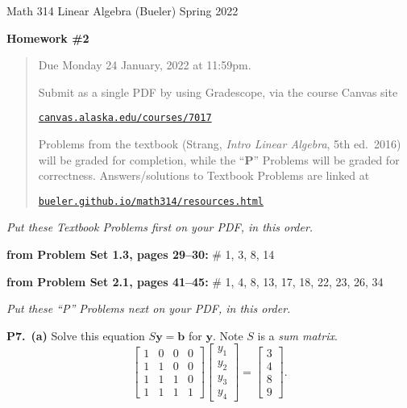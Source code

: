 \documentclass[12pt]{amsart}
\newcommand{\bb}{\bm{b}}
\newcommand{\by}{\bm{y}}
\newcommand{\prob}[1]{\bigskip\noindent\textbf{#1}\quad }
\newcommand{\probset}[2]{\prob{from Problem Set #1, pages #2:}}
\newcommand{\ppart}[1]{\,\textbf{(#1)}\quad }
\begin{document}
\scriptsize \noindent Math 314 Linear Algebra (Bueler) \hfill Spring 2022
\normalsize\medskip

\Large
\centerline{\textbf{Homework \#2}}

\normalsize
\bigskip
\begin{quote}
Due Monday 24 January, 2022 at 11:59pm.

\medskip
\noindent Submit as a single PDF by using Gradescope, via the course Canvas site

\href{https://canvas.alaska.edu/courses/7017}{\texttt{canvas.alaska.edu/courses/7017}}

\noindent Problems from the textbook (Strang, \emph{Intro Linear Algebra}, 5th ed.~2016) will be graded for completion, while the ``\textbf{P}'' Problems will be graded for correctness.  Answers/solutions to Textbook Problems are linked at

\href{https://bueler.github.io/math314/resources.html}{\texttt{bueler.github.io/math314/resources.html}}
\end{quote}
\medskip

\thispagestyle{empty}

\noindent \hrulefill

\noindent \emph{Put these Textbook Problems first on your PDF, in this order.}

\probset{1.3}{29--30} \# 1, 3, 8, 14

\probset{2.1}{41--45} \# 1, 4, 8, 13, 17, 18, 22, 23, 26, 34


\bigskip
\noindent \hrulefill

\noindent \emph{Put these ``P'' Problems next on your PDF, in this order.}

\prob{P7.}  \ppart{a} Solve this equation $S \by = \bb$ for $\by$.  Note $S$ is a \emph{sum matrix}.
    $$\begin{bmatrix} 1 & 0 & 0 & 0 \\ 1 & 1 & 0 & 0 \\ 1 & 1 & 1 & 0 \\ 1 & 1 & 1 & 1 \end{bmatrix} \begin{bmatrix} y_1 \\ y_2 \\ y_3 \\ y_4 \end{bmatrix} = \begin{bmatrix} 3 \\ 4 \\ 8 \\ 9 \end{bmatrix}.$$
\end{document}
